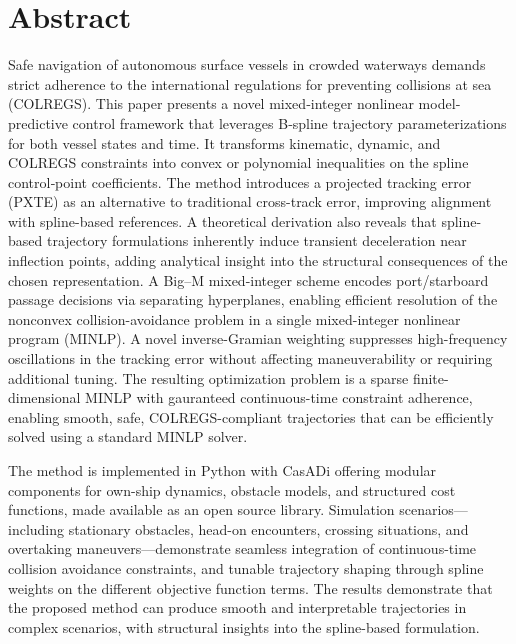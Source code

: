 
\pagestyle{fancy}
\fancyhf{}
\renewcommand{\chaptermark}[1]{\markboth{\chaptername\ \thechapter.\ #1}{}}
\renewcommand{\sectionmark}[1]{\markright{\thesection\ #1}}
\renewcommand{\headrulewidth}{0.1ex}
\renewcommand{\footrulewidth}{0.1ex}
\fancyfoot[LE,RO]{\thepage}
\fancypagestyle{plain}{\fancyhf{}\fancyfoot[LE,RO]{\thepage}\renewcommand{\headrulewidth}{0ex}}

\section*{\large Abstract}
\vspace{0.5cm}


Safe navigation of autonomous surface vessels in crowded waterways demands strict adherence to the international regulations for preventing collisions at sea (COLREGS). 
This paper presents a novel mixed‐integer nonlinear model‐predictive control framework that leverages B‐spline trajectory parameterizations for both vessel states and time. It transforms kinematic, dynamic, and COLREGS constraints into convex or polynomial inequalities on the spline control‐point coefficients.
The method introduces a projected tracking error (PXTE) as an alternative to traditional cross-track error, improving alignment with spline-based references. A theoretical derivation also reveals that spline-based trajectory formulations inherently induce transient deceleration near inflection points, adding analytical insight into the structural consequences of the chosen  representation.
A Big–M mixed-integer scheme encodes port/starboard passage decisions via separating hyperplanes, enabling efficient resolution of the nonconvex collision-avoidance problem in a single mixed-integer nonlinear program (MINLP).
A novel inverse-Gramian weighting suppresses high-frequency oscillations in the tracking error without affecting maneuverability or requiring additional tuning. The resulting optimization problem is a sparse finite-dimensional  MINLP with gauranteed continuous-time constraint adherence, enabling smooth, safe, COLREGS-compliant trajectories that can be efficiently solved using a standard MINLP solver.

The method is implemented in Python with CasADi offering modular components for own-ship dynamics, obstacle models, and structured cost functions, made available as an open source library. Simulation scenarios---including stationary obstacles, head-on encounters, crossing situations, and overtaking maneuvers---demonstrate seamless integration of continuous-time collision avoidance constraints, and tunable trajectory shaping through spline weights on the different objective function terms. The results demonstrate that the proposed method can produce smooth and interpretable 
trajectories in complex scenarios, with structural insights into the spline-based formulation.

